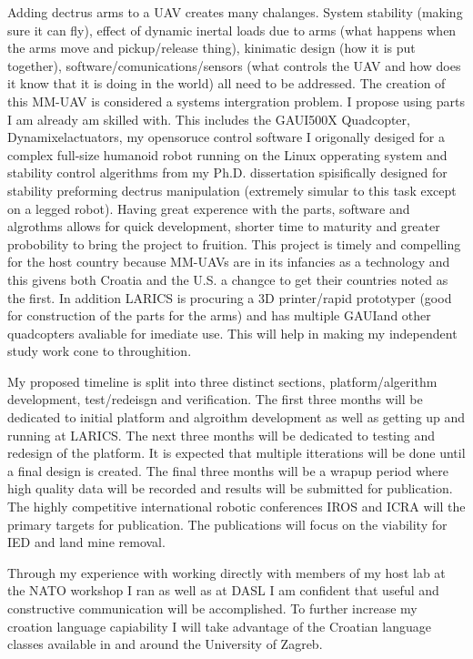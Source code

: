 \documentclass[12pt]{article}
\begin{document}
Adding dectrus arms to a UAV creates many chalanges.  
System stability (making sure it can fly), effect of dynamic inertal loads due to arms (what happens when the arms move and pickup/release thing), kinimatic design (how it is put together), software/comunications/sensors (what controls the UAV and how does it know that it is doing in the world) all need to be addressed.  
The creation of this MM-UAV is considered a systems intergration problem.  
I propose using parts I am already am skilled with.
This includes the GAUI\texttrademark 500X Quadcopter, Dynamixel\texttrademark actuators, my opensoruce control software I origonally desiged for a complex full-size humanoid robot running on the Linux opperating system and stability control algerithms from my Ph.D. dissertation spisifically designed for stability preforming dectrus manipulation (extremely simular to this task except on a legged robot).  
Having great experence with the parts, software and algrothms allows for quick development, shorter time to maturity and greater probobility to bring the project to fruition.  
This project is timely and compelling for the host country because MM-UAVs are in its infancies as a technology and this givens both Croatia and the U.S. a changce to get their countries noted as the first.  
In addition LARICS is procuring a 3D printer/rapid prototyper (good for construction of the parts for the arms) and has multiple GAUI\texttrademark and other quadcopters avaliable for imediate use.  This will help in making my independent study work cone to throughition.

My proposed timeline is split into three distinct sections, platform/algerithm development, test/redeisgn and verification.  
The first three months will be dedicated to initial platform and algroithm development as well as getting up and running at LARICS.  
The next three months will be dedicated to testing and redesign of the platform.  
It is expected that multiple itterations will be done until a final design is created.  
The final three months will be a wrapup period where high quality data will be recorded and results will be submitted for publication.  
The highly competitive international robotic conferences IROS and ICRA will the primary targets for publication.  
The publications will focus on the viability for IED and land mine removal.

Through my experience with working directly with members of my host lab at the NATO workshop I ran as well as at DASL I am confident that useful and constructive communication will be accomplished.  
To further increase my croation language capiability I will take advantage of the Croatian language classes available in and around the University of Zagreb. 
\end{document}
